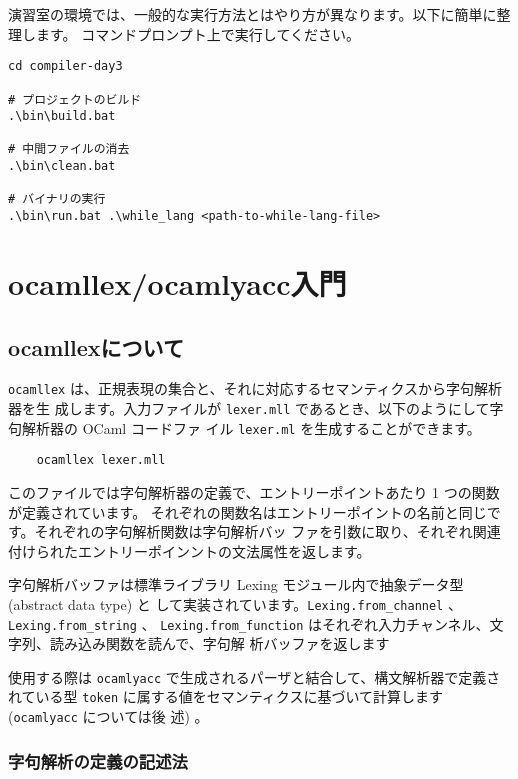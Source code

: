 \documentclass[a4paper,11pt]{jsarticle}
\begin{document}
演習室の環境では、一般的な実行方法とはやり方が異なります。以下に簡単に整理します。
コマンドプロンプト上で実行してください。

\begin{lstlisting}
cd compiler-day3

# プロジェクトのビルド
.\bin\build.bat

# 中間ファイルの消去
.\bin\clean.bat

# バイナリの実行
.\bin\run.bat .\while_lang <path-to-while-lang-file>
\end{lstlisting}

\newpage
\section{ocamllex/ocamlyacc入門}
\label{intro_lex_yacc}

\subsection{ocamllexについて}

\verb|ocamllex| は、正規表現の集合と、それに対応するセマンティクスから字句解析器を生
成します。入力ファイルが \verb|lexer.mll| であるとき、以下のようにして字句解析器の OCaml
コードファ イル \verb|lexer.ml| を生成することができます。

\begin{lstlisting}
    ocamllex lexer.mll
\end{lstlisting}

このファイルでは字句解析器の定義で、エントリーポイントあたり 1 つの関数が定義されています。
それぞれの関数名はエントリーポイントの名前と同じです。それぞれの字句解析関数は字句解析バッ
ファを引数に取り、それぞれ関連付けられたエントリーポインントの文法属性を返します。

字句解析バッファは標準ライブラリ Lexing モジュール内で抽象データ型 (abstract data type) と
して実装されています。\verb|Lexing.from_channel| 、\verb|Lexing.from_string| 、
\verb|Lexing.from_function| はそれぞれ入力チャンネル、文字列、読み込み関数を読んで、字句解
析バッファを返します

使用する際は \verb|ocamlyacc| で生成されるパーザと結合して、構文解析器で定義されている型
\verb|token| に属する値をセマンティクスに基づいて計算します (\verb|ocamlyacc| については後
述) 。

\subsubsection{字句解析の定義の記述法}
\end{document}
